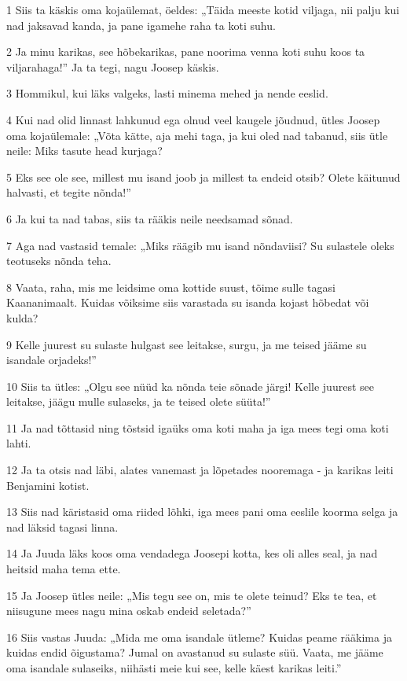 \par 1 Siis ta käskis oma kojaülemat, öeldes: „Täida meeste kotid viljaga, nii palju kui nad jaksavad kanda, ja pane igamehe raha ta koti suhu.
\par 2 Ja minu karikas, see hõbekarikas, pane noorima venna koti suhu koos ta viljarahaga!” Ja ta tegi, nagu Joosep käskis.
\par 3 Hommikul, kui läks valgeks, lasti minema mehed ja nende eeslid.
\par 4 Kui nad olid linnast lahkunud ega olnud veel kaugele jõudnud, ütles Joosep oma kojaülemale: „Võta kätte, aja mehi taga, ja kui oled nad tabanud, siis ütle neile: Miks tasute head kurjaga?
\par 5 Eks see ole see, millest mu isand joob ja millest ta endeid otsib? Olete käitunud halvasti, et tegite nõnda!”
\par 6 Ja kui ta nad tabas, siis ta rääkis neile needsamad sõnad.
\par 7 Aga nad vastasid temale: „Miks räägib mu isand nõndaviisi? Su sulastele oleks teotuseks nõnda teha.
\par 8 Vaata, raha, mis me leidsime oma kottide suust, tõime sulle tagasi Kaananimaalt. Kuidas võiksime siis varastada su isanda kojast hõbedat või kulda?
\par 9 Kelle juurest su sulaste hulgast see leitakse, surgu, ja me teised jääme su isandale orjadeks!”
\par 10 Siis ta ütles: „Olgu see nüüd ka nõnda teie sõnade järgi! Kelle juurest see leitakse, jäägu mulle sulaseks, ja te teised olete süüta!”
\par 11 Ja nad tõttasid ning tõstsid igaüks oma koti maha ja iga mees tegi oma koti lahti.
\par 12 Ja ta otsis nad läbi, alates vanemast ja lõpetades nooremaga - ja karikas leiti Benjamini kotist.
\par 13 Siis nad käristasid oma riided lõhki, iga mees pani oma eeslile koorma selga ja nad läksid tagasi linna.
\par 14 Ja Juuda läks koos oma vendadega Joosepi kotta, kes oli alles seal, ja nad heitsid maha tema ette.
\par 15 Ja Joosep ütles neile: „Mis tegu see on, mis te olete teinud? Eks te tea, et niisugune mees nagu mina oskab endeid seletada?”
\par 16 Siis vastas Juuda: „Mida me oma isandale ütleme? Kuidas peame rääkima ja kuidas endid õigustama? Jumal on avastanud su sulaste süü. Vaata, me jääme oma isandale sulaseiks, niihästi meie kui see, kelle käest karikas leiti.”
